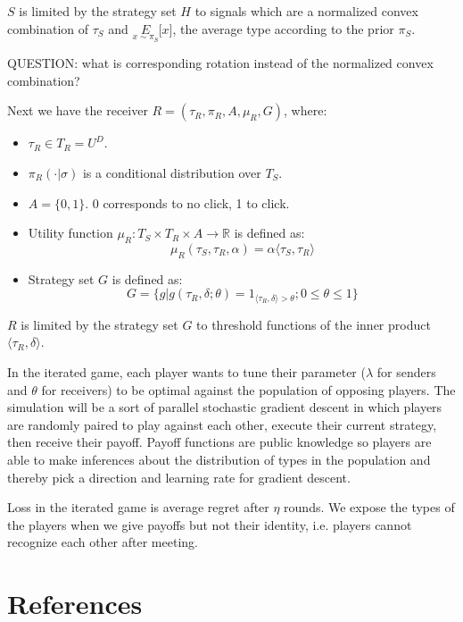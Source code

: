 \documentclass{article}
\begin{document}
\noindent $S$ is limited by the strategy set $H$ to signals which are a normalized convex combination of $\tau_S$ and $\underset{x\sim\pi_S}{E}\lbrack x \rbrack$, the average type according to the prior $\pi_S$.

QUESTION: what is corresponding rotation instead of the normalized convex combination?

\noindent Next we have the receiver $R = (\tau_R, \pi_R, A, \mu_R, G)$, where:
\begin{itemize}
	\item $\tau_R \in T_R = U^D$.
	\item $\pi_R(\cdot|\sigma)$ is a conditional distribution over $T_S$.
	\item $A = \lbrace 0,1 \rbrace$. 0 corresponds to no click, 1 to click.
	\item Utility function $\mu_R: T_S \times T_R \times A \rightarrow \mathbb{R}$ is defined as:
	\begin{equation}
		\mu_R(\tau_S, \tau_R, \alpha) = \alpha \langle \tau_S, \tau_R \rangle
	\end{equation}
	\item Strategy set $G$ is defined as:
	\begin{equation}
		G = \lbrace g | g(\tau_R, \delta; \theta) = 1_{\langle \tau_R, \delta \rangle > \theta}; 0 \le \theta \le 1 \rbrace
	\end{equation}
\end{itemize}

\noindent $R$ is limited by the strategy set $G$ to threshold functions of the inner product $\langle \tau_R, \delta \rangle$.

In the iterated game, each player wants to tune their parameter ($\lambda$ for senders and $\theta$ for receivers) to be optimal against the population of opposing players. The simulation will be a sort of parallel stochastic gradient descent in which players are randomly paired to play against each other, execute their current strategy, then receive their payoff. Payoff functions are public knowledge so players are able to make inferences about the distribution of types in the population and thereby pick a direction and learning rate for gradient descent.

Loss in the iterated game is average regret after $\eta$ rounds. We expose the types of the players when we give payoffs but not their identity, i.e. players cannot recognize each other after meeting.


\section{References}



\end{document}
